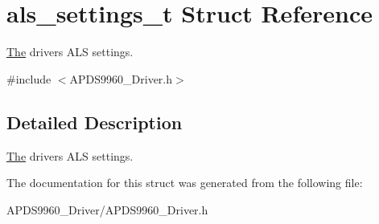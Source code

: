 \hypertarget{structals__settings__t}{}\section{als\+\_\+settings\+\_\+t Struct Reference}
\label{structals__settings__t}


\hyperlink{structThe}{The} driver\textquotesingle{}s A\+LS settings.  




{\ttfamily \#include $<$A\+P\+D\+S9960\+\_\+\+Driver.\+h$>$}



\subsection{Detailed Description}
\hyperlink{structThe}{The} driver\textquotesingle{}s A\+LS settings. 

The documentation for this struct was generated from the following file\+:\begin{DoxyCompactItemize}
\item 
A\+P\+D\+S9960\+\_\+\+Driver/A\+P\+D\+S9960\+\_\+\+Driver.\+h\end{DoxyCompactItemize}
